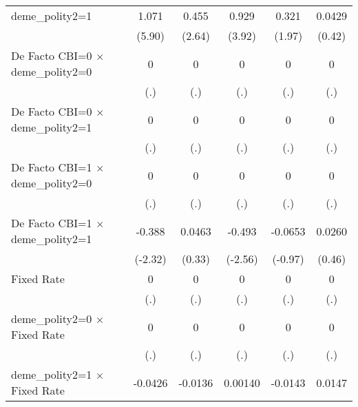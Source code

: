 \begin{table}[htbp]
\begin{tabular}{l*{5}{c}}
deme\_polity2=1                          &    1.071\sym{***}&    0.455\sym{**} &    0.929\sym{***}&    0.321         &   0.0429         \\
                                        &   (5.90)         &   (2.64)         &   (3.92)         &   (1.97)         &   (0.42)         \\
\addlinespace
De Facto CBI=0 $\times$ deme\_polity2=0  &        0         &        0         &        0         &        0         &        0         \\
                                        &      (.)         &      (.)         &      (.)         &      (.)         &      (.)         \\
\addlinespace
De Facto CBI=0 $\times$ deme\_polity2=1  &        0         &        0         &        0         &        0         &        0         \\
                                        &      (.)         &      (.)         &      (.)         &      (.)         &      (.)         \\
\addlinespace
De Facto CBI=1 $\times$ deme\_polity2=0  &        0         &        0         &        0         &        0         &        0         \\
                                        &      (.)         &      (.)         &      (.)         &      (.)         &      (.)         \\
\addlinespace
De Facto CBI=1 $\times$ deme\_polity2=1  &   -0.388\sym{*}  &   0.0463         &   -0.493\sym{*}  &  -0.0653         &   0.0260         \\
                                        &  (-2.32)         &   (0.33)         &  (-2.56)         &  (-0.97)         &   (0.46)         \\
\addlinespace
Fixed Rate                              &        0         &        0         &        0         &        0         &        0         \\
                                        &      (.)         &      (.)         &      (.)         &      (.)         &      (.)         \\
\addlinespace
deme\_polity2=0 $\times$ Fixed Rate      &        0         &        0         &        0         &        0         &        0         \\
                                        &      (.)         &      (.)         &      (.)         &      (.)         &      (.)         \\
\addlinespace
deme\_polity2=1 $\times$ Fixed Rate      &  -0.0426\sym{**} &  -0.0136         &  0.00140         &  -0.0143         &   0.0147         \\

\end{tabular}
\end{table}
